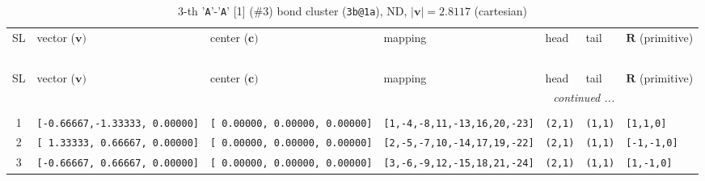 \documentclass[fleqn,10pt,landscape]{jsarticle}
\begin{document}
\begin{longtable}[l]{cllllll}
\captionsetup{justification=raggedright, singlelinecheck=off}
\caption{3-th '\texttt{A}'-'\texttt{A}' [1] (\#3) bond cluster (\texttt{3b@1a}), ND, $|\bm{v}|=2.8117$ (cartesian)}
 \\
 \hline \hline
SL & vector ($\bm{v})$ & center ($\bm{c})$ & mapping & head & tail & $\bm{R}$ (primitive) \\ \hline \endfirsthead

\multicolumn{6}{l}{\tablename\ \thetable{}} \\
 \hline \hline
SL & vector ($\bm{v})$ & center ($\bm{c})$ & mapping & head & tail & $\bm{R}$ (primitive) \\ \hline \endhead

 \hline \hline
\multicolumn{6}{r}{\footnotesize\it continued ...} \\ \endfoot

 \hline \hline
\multicolumn{6}{r}{} \\ \endlastfoot

1 & \texttt{[-0.66667,-1.33333, 0.00000]} & \texttt{[ 0.00000, 0.00000, 0.00000]} & \texttt{[1,-4,-8,11,-13,16,20,-23]} & \texttt{(2,1)} & \texttt{(1,1)} & \texttt{[1,1,0]} \\ \hline
2 & \texttt{[ 1.33333, 0.66667, 0.00000]} & \texttt{[ 0.00000, 0.00000, 0.00000]} & \texttt{[2,-5,-7,10,-14,17,19,-22]} & \texttt{(2,1)} & \texttt{(1,1)} & \texttt{[-1,-1,0]} \\ \hline
3 & \texttt{[-0.66667, 0.66667, 0.00000]} & \texttt{[ 0.00000, 0.00000, 0.00000]} & \texttt{[3,-6,-9,12,-15,18,21,-24]} & \texttt{(2,1)} & \texttt{(1,1)} & \texttt{[1,-1,0]} \\
\end{longtable}
\renewcommand{\arraystretch}{1.6}
\end{document}
